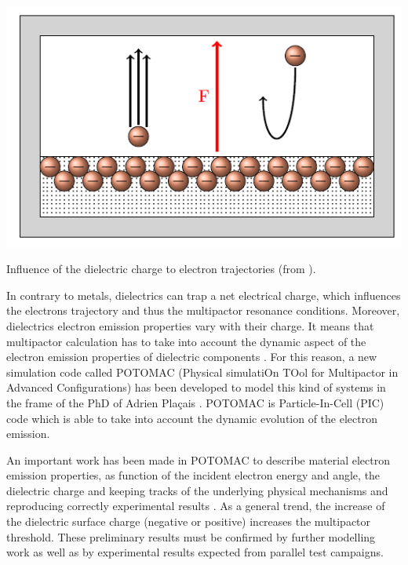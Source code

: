 \begin{marginfigure}
	\centering
	\includegraphics[width=1.0\linewidth]{figures/chap4/dielectric_electrical_charge_effect}
	\caption{Influence of the dielectric charge to electron trajectories (from ).}
	\label{fig:dielectricelectricalchargeeffect}
\end{marginfigure}

In contrary to metals, dielectrics can trap a net electrical charge, which influences the electrons trajectory and thus the multipactor resonance conditions. Moreover, dielectrics electron emission properties vary with their charge. It means that multipactor calculation has to take into account the dynamic aspect of the electron emission properties of dielectric components . For this reason, a new simulation code called POTOMAC (Physical simulatiOn TOol for Multipactor in Advanced Configurations) has been developed to model this kind of systems in the frame of the PhD of Adrien Plaçais . POTOMAC is Particle-In-Cell (PIC) code which is able to take into account the dynamic evolution of the electron emission. 

An important work has been made in POTOMAC to describe material electron emission properties, as function of the incident electron energy and angle, the dielectric charge and keeping tracks of the underlying physical mechanisms and reproducing correctly experimental results . As a general trend, the increase of the dielectric surface charge (negative or positive) increases the multipactor threshold. These preliminary results must be confirmed by further modelling work as well as by experimental results expected from parallel test campaigns.



